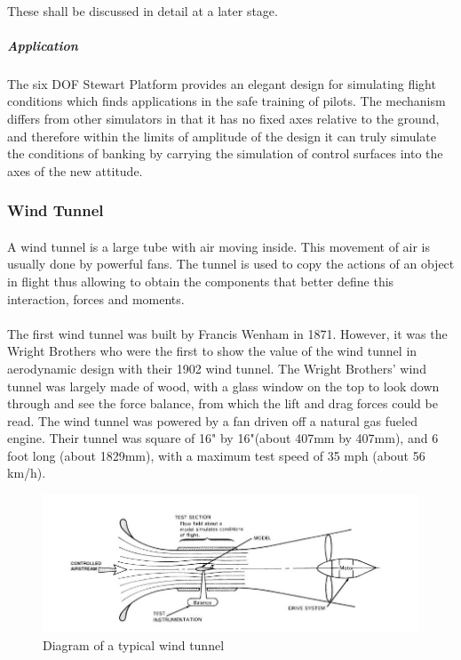 \paragraph{}These shall be discussed in detail at a later stage.

\subparagraph{Application}
\paragraph{}The six DOF Stewart Platform provides an elegant design for simulating flight conditions which finds applications in the safe training of pilots. The mechanism differs from other simulators in that it has no fixed axes relative to the ground, and therefore within the limits of amplitude of the design it can truly simulate the conditions of banking by carrying the simulation of control surfaces into the axes of the new attitude.

\subsubsection{Wind Tunnel}
\paragraph{}
A wind tunnel is a large tube with air moving inside. This movement of air is usually done by powerful fans. The tunnel is used to copy the actions of an object in flight thus allowing
to obtain the components that better define this interaction, forces and moments.

\paragraph{} The first wind tunnel was built by
Francis Wenham in 1871. However, it was the Wright Brothers who were the first to show the value of the wind tunnel in aerodynamic design with their 1902 wind tunnel.  The Wright Brothers’ wind tunnel was largely made of wood, with a glass window on the top to look down through and see the force balance, from which the
lift and drag forces could be read. The wind tunnel was powered by a fan driven off a natural gas fueled engine. Their tunnel was square of 16" by 16"(about 407mm by 407mm), and 6 foot long (about 1829mm), with a maximum test speed of 35 mph (about 56 km/h).
\begin{center}
	\begin{figure}[!h]
	\centering
	\includegraphics{Figures/Fig2}
	\caption{Diagram of a typical wind tunnel}
	\end{figure}
\end{center}

